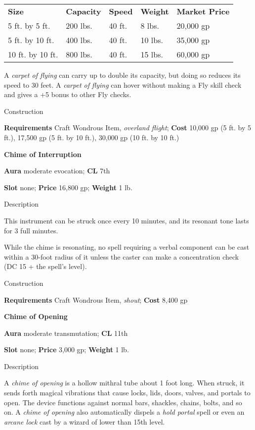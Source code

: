 \begin{tabular}{lllll}
\textbf{Size} & \textbf{Capacity} & \textbf{Speed} & \textbf{Weight} & \textbf{Market Price}\\
5 ft. by 5 ft. & 200 lbs. & 40 ft. & 8 lbs. & 20,000 gp\\
5 ft. by 10 ft. & 400 lbs. & 40 ft. & 10 lbs. & 35,000 gp\\
10 ft. by 10 ft. & 800 lbs. & 40 ft. & 15 lbs. & 60,000 gp\\
\end{tabular}

				
A \textit{carpet of flying }can carry up to double its capacity, but doing so reduces its speed to 30 feet. A \textit{carpet of flying }can hover without making a Fly skill check and gives a +5 bonus to other Fly checks. 
				
Construction
				
\textbf{Requirements} Craft Wondrous Item, \textit{overland flight}; \textbf{Cost }10,000 gp (5 ft. by 5 ft.), 17,500 gp (5 ft. by 10 ft.), 30,000 gp (10 ft. by 10 ft.)
				
\textbf{Chime of Interruption}
				
\textbf{Aura} moderate evocation;\textbf{ CL }7th
				
\textbf{Slot} none; \textbf{Price} 16,800 gp; \textbf{Weight} 1 lb.
				
Description
				
This instrument can be struck once every 10 minutes, and its resonant tone lasts for 3 full minutes.
				
While the chime is resonating, no spell requiring a verbal component can be cast within a 30-foot radius of it unless the caster can make a concentration check (DC 15 + the spell's level). 
				
Construction
				
\textbf{Requirements} Craft Wondrous Item, \textit{shout}; \textbf{Cost }8,400 gp
				
\textbf{Chime of Opening}
				
\textbf{Aura} moderate transmutation;\textbf{ CL }11th
				
\textbf{Slot} none; \textbf{Price} 3,000 gp; \textbf{Weight} 1 lb.
				
Description
				
A \textit{chime of opening }is a hollow mithral tube about 1 foot long. When struck, it sends forth magical vibrations that cause locks, lids, doors, valves, and portals to open. The device functions against normal bars, shackles, chains, bolts, and so on. A \textit{chime of opening }also automatically dispels a \textit{hold portal }spell or even an \textit{arcane lock }cast by a wizard of lower than 15th level.
				
